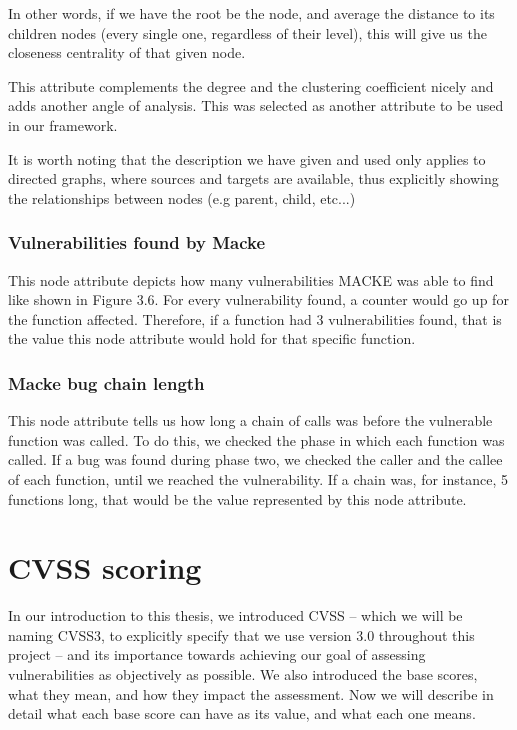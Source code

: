 In other words, if we have the root be the node, and average the distance to its children nodes (every single one, regardless of their level), this will give us the closeness centrality of that given node.

This attribute complements the degree and the clustering coefficient nicely and adds another angle of analysis. This was selected as another attribute to be used in our framework.

It is worth noting that the description we have given and used only applies to directed graphs, where sources and targets are available, thus explicitly showing the relationships between nodes (e.g parent, child, etc...)

\subsubsection{Vulnerabilities found by Macke}

This node attribute depicts how many vulnerabilities MACKE was able to find like shown in Figure 3.6. For every vulnerability found, a counter would go up for the function affected. Therefore, if a function had 3 vulnerabilities found, that is the value this node attribute would hold for that specific function.

\subsubsection{Macke bug chain length}

This node attribute tells us how long a chain of calls was before the vulnerable function was called. To do this, we checked the phase in which each function was called. If a bug was found during phase two, we checked the caller and the callee of each function, until we reached the vulnerability. If a chain was, for instance, 5 functions long, that would be the value represented by this node attribute.

\section{CVSS scoring}

In our introduction to this thesis, we introduced CVSS -- which we will be naming CVSS3, to explicitly specify that we use version 3.0 throughout this project -- and its importance towards achieving our goal of assessing vulnerabilities as objectively as possible. We also introduced the base scores, what they mean, and how they impact the assessment. Now we will describe in detail what each base score can have as its value, and what each one means.

